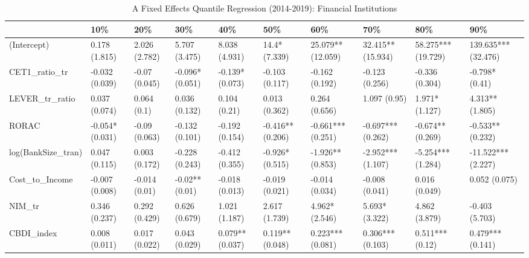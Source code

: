 \begin{table}[ht]
\centering
\caption{A Fixed Effects Quantile Regression (2014-2019): Financial Institutions} 
\begingroup\small
\begin{tabular}{llllllllll}
  \toprule
 & 10\% & 20\% & 30\% & 40\% & 50\% & 60\% & 70\% & 80\% & 90\% \\ 
  \midrule
(Intercept) & 0.178 (1.815) & 2.026 (2.782) & 5.707 (3.475) & 8.038 (4.931) & 14.4* (7.339) & 25.079** (12.059) & 32.415** (15.934) & 58.275*** (19.729) & 139.635*** (32.476) \\ 
  CET1\_ratio\_tr & -0.032 (0.039) & -0.07 (0.045) & -0.096* (0.051) & -0.139* (0.073) & -0.103 (0.117) & -0.162 (0.192) & -0.123 (0.256) & -0.336 (0.304) & -0.798* (0.41) \\ 
  LEVER\_tr\_ratio & 0.037 (0.074) & 0.064 (0.1) & 0.036 (0.132) & 0.104 (0.21) & 0.013 (0.362) & 0.264 (0.656) & 1.097 (0.95) & 1.971* (1.127) & 4.313** (1.805) \\ 
  RORAC & -0.054* (0.031) & -0.09 (0.063) & -0.132 (0.101) & -0.192 (0.154) & -0.416** (0.206) & -0.661*** (0.251) & -0.697*** (0.262) & -0.674** (0.269) & -0.533** (0.232) \\ 
  log(BankSize\_tran) & 0.047 (0.115) & 0.003 (0.172) & -0.228 (0.243) & -0.412 (0.355) & -0.926* (0.515) & -1.926** (0.853) & -2.952*** (1.107) & -5.254*** (1.284) & -11.522*** (2.227) \\ 
  Cost\_to\_Income & -0.007 (0.008) & -0.014 (0.01) & -0.02** (0.01) & -0.018 (0.013) & -0.019 (0.021) & -0.014 (0.034) & -0.008 (0.041) & 0.016 (0.049) & 0.052 (0.075) \\ 
  NIM\_tr & 0.346 (0.237) & 0.292 (0.429) & 0.626 (0.679) & 1.021 (1.187) & 2.617 (1.739) & 4.962* (2.546) & 5.693* (3.322) & 4.862 (3.879) & -0.403 (5.703) \\ 
  CBDI\_index & 0.008 (0.011) & 0.017 (0.022) & 0.043 (0.029) & 0.079** (0.037) & 0.119** (0.048) & 0.223*** (0.081) & 0.306*** (0.103) & 0.511*** (0.12) & 0.479*** (0.141) \\ 
   \bottomrule
\end{tabular}
\endgroup
\end{table}
